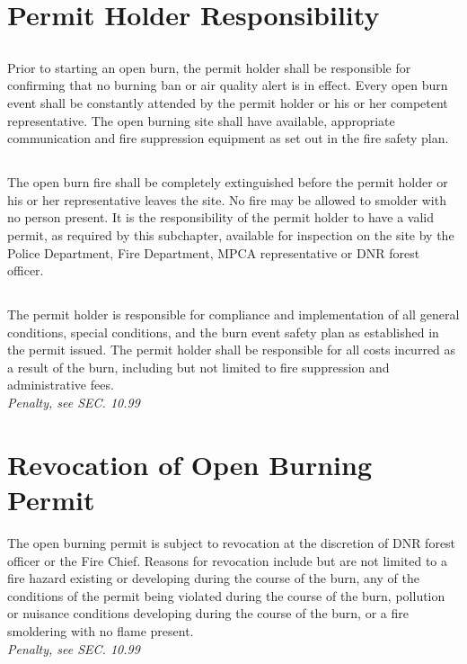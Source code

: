 \documentclass[code.tex]{subfiles}
\begin{document}
\section{Permit Holder Responsibility}
\subsection{}
Prior to starting an open burn, the permit holder shall be responsible for confirming that no burning ban or air quality alert is in effect.  Every open burn event shall be constantly attended by the permit holder or his or her competent representative.  The open burning site shall have available, appropriate communication and fire suppression equipment as set out in the fire safety plan.
\subsection{}
The open burn fire shall be completely extinguished before the permit holder or his or her representative leaves the site.  No fire may be allowed to smolder with no person present.  It is the responsibility of the permit holder to have a valid permit, as required by this subchapter, available for inspection on the site by the Police Department, Fire Department, MPCA representative or DNR forest officer.
\subsection{}
The permit holder is responsible for compliance and implementation of all general conditions, special conditions, and the burn event safety plan as established in the permit issued.  The permit holder shall be responsible for all costs incurred as a result of the burn, including but not limited to fire suppression and administrative fees.\\
\emph{Penalty, see SEC. 10.99}
\section{Revocation of Open Burning Permit}
The open burning permit is subject to revocation at the discretion of DNR forest officer or the Fire Chief.  Reasons for revocation include but are not limited to a fire hazard existing or developing during the course of the burn, any of the conditions of the permit being violated during the course of the burn, pollution or nuisance conditions developing during the course of the burn, or a fire smoldering with no flame present.\\
\emph{Penalty, see SEC. 10.99}
\end{document}
